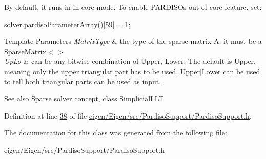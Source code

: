 By default, it runs in in-\/core mode. To enable P\+A\+R\+D\+I\+SO\textquotesingle{}s out-\/of-\/core feature, set\+: 
\begin{DoxyCode}
solver.pardisoParameterArray()[59] = 1; 
\end{DoxyCode}



\begin{DoxyTemplParams}{Template Parameters}
{\em Matrix\+Type} & the type of the sparse matrix A, it must be a Sparse\+Matrix$<$$>$ \\
\hline
{\em Up\+Lo} & can be any bitwise combination of Upper, Lower. The default is Upper, meaning only the upper triangular part has to be used. Upper$\vert$\+Lower can be used to tell both triangular parts can be used as input.\\
\hline
\end{DoxyTemplParams}


\begin{DoxySeeAlso}{See also}
\hyperlink{SparseLinearSystems.dox_TutorialSparseSolverConcept}{Sparse solver concept}, class \hyperlink{group___sparse_cholesky___module_class_eigen_1_1_simplicial_l_l_t}{Simplicial\+L\+LT} 
\end{DoxySeeAlso}


Definition at line \hyperlink{eigen_2_eigen_2src_2_pardiso_support_2_pardiso_support_8h_source_l00038}{38} of file \hyperlink{eigen_2_eigen_2src_2_pardiso_support_2_pardiso_support_8h_source}{eigen/\+Eigen/src/\+Pardiso\+Support/\+Pardiso\+Support.\+h}.



The documentation for this class was generated from the following file\+:\begin{DoxyCompactItemize}
\item 
eigen/\+Eigen/src/\+Pardiso\+Support/\+Pardiso\+Support.\+h\end{DoxyCompactItemize}

